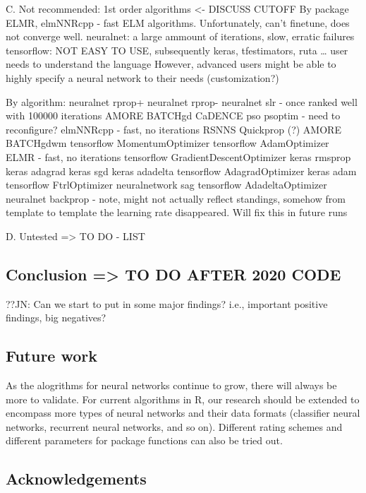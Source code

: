C. Not recommended: 1st order algorithms \textless- DISCUSS CUTOFF By
package ELMR, elmNNRcpp - fast ELM algorithms. Unfortunately, can't
finetune, does not converge well. neuralnet: a large ammount of
iterations, slow, erratic failures tensorflow: NOT EASY TO USE,
subsequently keras, tfestimators, ruta \ldots{} user needs to understand
the language However, advanced users might be able to highly specify a
neural network to their needs (customization?)

By algorithm: neuralnet rprop+ neuralnet rprop- neuralnet slr - once
ranked well with 100000 iterations AMORE BATCHgd CaDENCE pso psoptim -
need to reconfigure? elmNNRcpp - fast, no iterations RSNNS Quickprop (?)
AMORE BATCHgdwm tensorflow MomentumOptimizer tensorflow AdamOptimizer
ELMR - fast, no iterations tensorflow GradientDescentOptimizer keras
rmsprop keras adagrad keras sgd keras adadelta tensorflow
AdagradOptimizer keras adam tensorflow FtrlOptimizer neuralnetwork sag
tensorflow AdadeltaOptimizer neuralnet backprop - note, might not
actually reflect standings, somehow from template to template the
learning rate disappeared. Will fix this in future runs

D. Untested =\textgreater{} TO DO - LIST

\hypertarget{conclusion-to-do-after-2020-code}{%
\subsection{Conclusion =\textgreater{} TO DO AFTER 2020
CODE}\label{conclusion-to-do-after-2020-code}}

??JN: Can we start to put in some major findings? i.e., important
positive findings, big negatives?

\hypertarget{future-work}{%
\subsection{Future work}\label{future-work}}

As the alogrithms for neural networks continue to grow, there will
always be more to validate. For current algorithms in R, our research
should be extended to encompass more types of neural networks and their
data formats (classifier neural networks, recurrent neural networks, and
so on). Different rating schemes and different parameters for package
functions can also be tried out.

\hypertarget{acknowledgements}{%
\subsection{Acknowledgements}\label{acknowledgements}}

